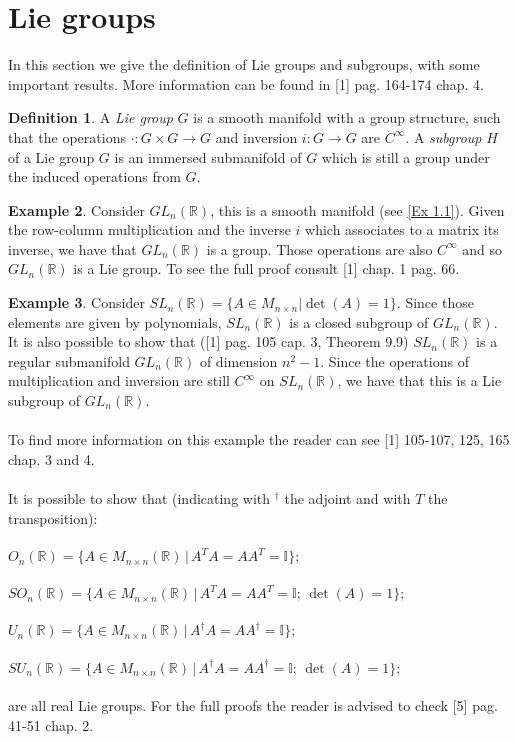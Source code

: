 \documentclass[12pt,a4paper]{report}
\theoremstyle{definition}
\newtheorem{Def}{Definition}[chapter]
\theoremstyle{Theorem}
\theoremstyle{definition}
\newtheorem{Ex}[Def]{Example}
\theoremstyle{definition}
\begin{document}
	\section{Lie groups}
	In this section we give the definition of Lie groups and subgroups, with some important results. More information can be found in [1] pag. 164-174 chap. 4.
	\begin{Def}
		A \textit{Lie group} $G$ is a smooth manifold with a group structure, such that the operations $\cdot:G\times G\rightarrow G$ and inversion $i:G\rightarrow G$ are $C^\infty$.
		A \textit{subgroup} $H$ of a Lie group $G$ is an immersed submanifold of $G$ which is still a group under the induced operations from $G$.
	\end{Def}
	\begin{Ex}
		Consider $GL_n(\mathbb{R})$, this is a smooth manifold (see \ref{Ex 1.1}). Given the row-column multiplication and the inverse $i$ which associates to a matrix its inverse, we have that $GL_n(\mathbb{R})$ is a group. Those operations are also $C^\infty$ and so $GL_n(\mathbb{R})$ is a Lie group. To see the full proof consult [1] chap. 1 pag. 66.
	\end{Ex}
	\begin{Ex}
		Consider $SL_n(\mathbb{R})=\{A\in M_{n\times n}| \det(A)=1\}$. Since those elements are given by polynomials, $SL_n(\mathbb{R})$ is a closed subgroup of $GL_n(\mathbb{R})$. It is also possible to show that ([1] pag. 105 cap. 3, Theorem 9.9) $SL_n(\mathbb{R})$ is a regular submanifold $GL_n(\mathbb{R})$ of dimension $n^2-1$. Since the operations of multiplication and inversion are still $C^\infty$ on $SL_n(\mathbb{R})$, we have that this is a Lie subgroup of $GL_n(\mathbb{R})$.\\
		\\
		To find more information on this example the reader can see [1] 105-107, 125, 165 chap. 3 and 4.\\
		\\
		It is possible to show that (indicating with $^\dagger$ the adjoint and with $T$ the transposition):\\\\
		$O_n(\mathbb{R})=\{A\in M_{n\times n}(\mathbb{R})\, |\, A^TA=AA^T=\mathbb{I}\};$\\\\
		$SO_n(\mathbb{R})=\{A\in M_{n\times n}(\mathbb{R})\, |\, A^TA=AA^T=\mathbb{I};\, \det(A)=1\};$\\\\
		$U_n(\mathbb{R})=\{A\in M_{n\times n}(\mathbb{R})\, |\, A^\dagger A=AA^\dagger=\mathbb{I}\};$\\\\
		$SU_n(\mathbb{R})=\{A\in M_{n\times n}(\mathbb{R})\, |\, A^\dagger A=AA^\dagger=\mathbb{I};\,\det(A)=1\};$\\\\
		are all real Lie groups. 
		For the full proofs the reader is advised to check [5] pag. 41-51 chap. 2.
	\end{Ex}
\end{document}
